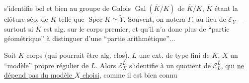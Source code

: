 
s'identifie bel et bien au groupe
de Galois $\operatorname{Gal}(\overline K/K)$ de  $\overline K/K$,
$\overline K$ étant la clôture sép. de $K$ telle que
$\operatorname{Spec}\overline K\simeq\widetilde Y$. Souvent, on notera
$\Gamma$,  au lieu de $\mathcal E_Y$ --- surtout
si $K$ est alg. sur le corps premier,
et qu'il n'a donc plus de ``partie
géométrique'' à distinguer d'une
``partie arithmétique''$\ldots$

Soit  $K$  corps (qui pourrait
être alg. clos), $L$ une ext. de
type fini de $K$, $X$ un ``modèle''
propre régulier de $L$. Alors
$\mathcal E_X^{\overline L}$ s'identifie à un quotient de $\mathcal E_L^{\overline L}$,
qui \uline{ne  dépend pas du modèle
$X$ choisi}, comme il est bien connu

